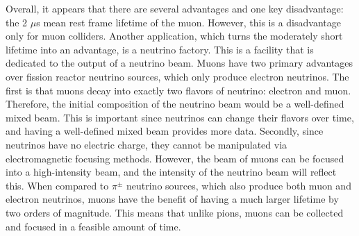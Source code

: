 Overall, it appears that there are several advantages and one key disadvantage: the 2 $\mu$s mean rest frame lifetime of the muon. However, this is a disadvantage only for muon colliders. Another application, which turns the moderately short lifetime into an advantage, is a neutrino factory. This is a facility that is dedicated to the output of a neutrino beam. Muons have two primary advantages over fission reactor neutrino sources, which only produce electron neutrinos. The first is that muons decay into exactly two flavors of neutrino: electron and muon. Therefore, the initial composition of the neutrino beam would be a well-defined mixed beam. This is important since neutrinos can change their flavors over time, and having a well-defined mixed beam provides more data. Secondly, since neutrinos have no electric charge, they cannot be manipulated via electromagnetic focusing methods. However, the beam of muons can be focused into a high-intensity beam, and the intensity of the neutrino beam will reflect this. When compared to $\pi^\pm$ neutrino sources, which also produce both muon and electron neutrinos, muons have the benefit of having a much larger lifetime by two orders of magnitude. This means that unlike pions, muons can be collected and focused in a feasible amount of time.

